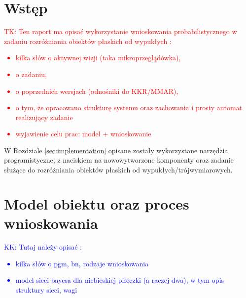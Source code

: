 \documentclass{../common/tk_iaiis}
\title{}
\author{}
\date{\today}
\newcommand{\ckk}[1]{\textcolor{red}{TK: #1}}
\newcommand{\cik}[2]{\ckk{#1 :\begin{itemize}#2\end{itemize}}}
\newcommand{\nkk}[1]{\textcolor{blue}{KK: #1}}
\newcommand{\nik}[2]{\nkk{#1 :\begin{itemize}#2\end{itemize}}}
\begin{document}
\maketitle

\tableofcontents

\chapter{Wstęp}
\cik{Ten raport ma opisać wykorzystanie wnioskowania probabilistycznego w zadaniu rozróżniania obiektów płaskich od wypukłych}
{
\item kilka słów o aktywnej wizji (taka mikroprzeglądówka), 
\item o zadaniu,
\item o poprzednich wersjach (odnośniki do KKR/MMAR),
\item o tym, że opracowano strukturę systemu oraz zachowania i prosty automat realizujący zadanie
\item wyjawienie celu prac: model + wnioskowanie
}


W Rozdziale \ref{sec:implementation} opisane zostały wykorzystane narzędzia programistyczne, z naciskiem na nowowytworzone komponenty oraz zadanie służące do rozróżniania obiektów płaskich od wypukłych/trójwymiarowych.

\chapter{Model obiektu oraz proces wnioskowania}
\nik{Tutaj należy opisać}
{
\item kilka słów o pgm, bn, rodzaje wnioskowania
\item model sieci bayesa dla niebieskiej piłeczki (a raczej dwa), w tym opis struktury sieci, wagi
}




\end{document}
